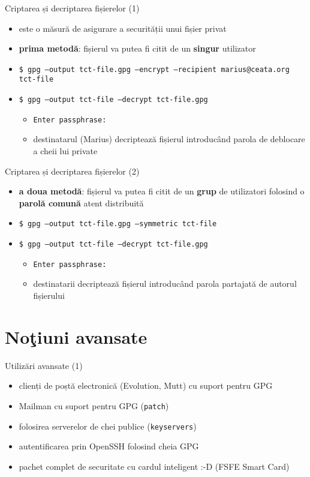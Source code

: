 \documentclass{beamer}
\begin{document}
\begin{frame}{Criptarea și decriptarea fișierelor (1)}
  \begin{itemize}
    \item este o măsură de asigurare a securității unui fișier privat
    \item \textbf{prima metodă}: fișierul va putea fi citit de un
    \textbf{singur} utilizator
    \item \texttt{\$ gpg --output tct-file.gpg --encrypt --recipient
    marius@ceata.org tct-file}
    \item \texttt{\$ gpg --output tct-file --decrypt tct-file.gpg}
    \begin{itemize}
      \item \texttt{Enter passphrase: }
      \item destinatarul (Marius) decriptează fișierul introducând parola de
      deblocare a cheii lui private
    \end{itemize}
  \end{itemize}
\end{frame}

\begin{frame}{Criptarea și decriptarea fișierelor (2)}
  \begin{itemize}
    \item \textbf{a doua metodă}: fișierul va putea fi citit de un
    \textbf{grup} de utilizatori folosind o \textbf{parolă comună} atent
    distribuită
    \item \texttt{\$ gpg --output tct-file.gpg --symmetric tct-file}
    \item \texttt{\$ gpg --output tct-file --decrypt tct-file.gpg}
    \begin{itemize}
      \item \texttt{Enter passphrase: }
      \item destinatarii decriptează fișierul introducând parola 
      partajată de autorul fișierului
    \end{itemize}
  \end{itemize}
\end{frame}

\section{No\c{t}iuni avansate}
\frame{\tableofcontents[currentsection]}

\begin{frame}{Utilizări avansate (1)}
  \begin{itemize}
    \item clienți de poștă electronică (Evolution, Mutt) cu suport pentru GPG
    \item Mailman cu suport pentru GPG (\texttt{patch})
    \item folosirea serverelor de chei publice (\texttt{keyservers})
    \item autentificarea prin OpenSSH folosind cheia GPG
    \item pachet complet de securitate cu cardul inteligent :-D (FSFE Smart
    Card)
  \end{itemize}
\end{frame}
\end{document}
